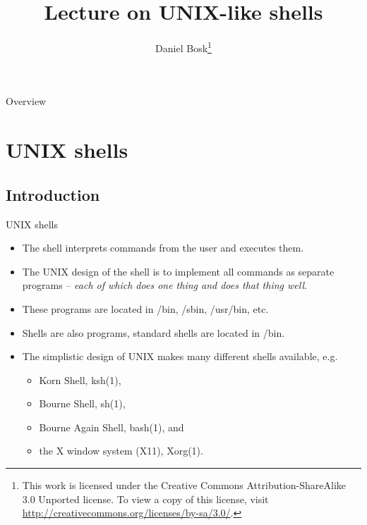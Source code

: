 \documentclass[handout]{beamer}
\title[UNIX-like shells]{%
	Lecture on UNIX-like shells
}
\author{Daniel Bosk\footnote{%
  This work is licensed under the Creative Commons Attribution-ShareAlike 3.0 
  Unported license.
	To view a copy of this license, visit 
	\url{http://creativecommons.org/licenses/by-sa/3.0/}.
}}
\institute{%
  Department of Information and Communication Systems (ICS),\\
  Mid Sweden University, Sundsvall.
}
\date{\svnId}
\begin{document}
\begin{frame}
  \titlepage
\end{frame}

\begin{frame}{Overview}
	\tableofcontents
\end{frame}





\section{UNIX shells}

\subsection{Introduction}

\begin{frame}{UNIX shells}
	\begin{itemize}
		\item<1> The shell interprets commands from the user and executes them.

		\item<2> The UNIX design of the shell is to implement all commands as 
			separate programs -- \emph{each of which does one thing and does that 
			thing well}.

		\item<3> These programs are located in /bin, /sbin, /usr/bin, etc.

		\item<4> Shells are also programs, standard shells are located in /bin.

		\item<5> The simplistic design of UNIX makes many different shells 
			available, e.g.
			\begin{itemize}
				\item Korn Shell, ksh(1),
				\item Bourne Shell, sh(1),
				\item Bourne Again Shell, bash(1), and
				\item the X window system (X11), Xorg(1).
			\end{itemize}

	\end{itemize}
\end{frame}
\end{document}
